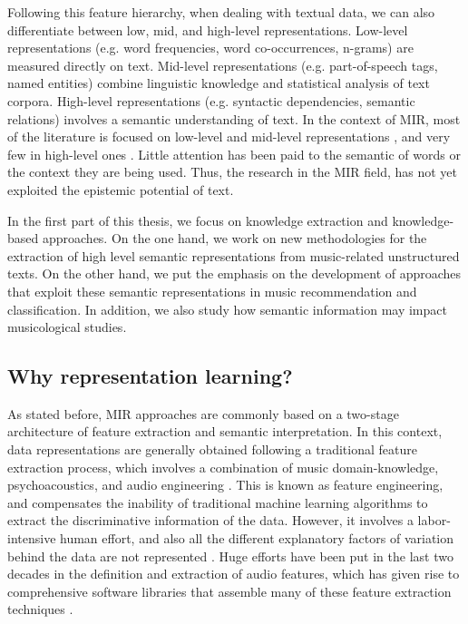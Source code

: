 Following this feature hierarchy, when dealing with textual data, we can also differentiate between low, mid, and high-level representations. Low-level representations (e.g. word frequencies, word co-occurrences, n-grams) are measured directly on text. Mid-level representations (e.g. part-of-speech tags, named entities) combine linguistic knowledge and statistical analysis of text corpora. High-level representations (e.g. syntactic dependencies, semantic relations) involves a semantic understanding of text. In the context of MIR, most of the literature is focused on low-level and mid-level representations \citep{Celma2006,lamere2008social,Whitman2002,Knees2013}, and very few in high-level ones \citep{Tata2010,Knees2011,Sordo2012}. Little attention has been paid to the semantic of words or the context they are being used. Thus, the research in the MIR field, has not yet exploited the epistemic potential of text.

In the first part of this thesis, we focus on knowledge extraction and knowledge-based approaches. On the one hand, we work on new methodologies for the extraction of high level semantic representations from music-related unstructured texts. On the other hand, we put the emphasis on the development of approaches that exploit these semantic representations in music recommendation and classification. In addition, we also study how semantic information may impact musicological studies.

\subsection{Why representation learning?}
\label{sec:intro:learning}

As stated before, MIR approaches are commonly based on a two-stage architecture of feature extraction and semantic interpretation. In this context, data representations are generally obtained following a traditional feature extraction process, which involves a combination of music domain-knowledge, psychoacoustics, and audio engineering \citep{humphrey2012}. 
This is known as feature engineering, and compensates the inability of traditional machine learning algorithms to extract the discriminative information of the data. However, it involves a labor-intensive human effort, and also all the different explanatory factors of variation behind the data are not represented \citep{bengio2013representation}. 
Huge efforts have been put in the last two decades in the definition and extraction of audio features, which has given rise to comprehensive software libraries that assemble many of these feature extraction techniques \citep{bogdanov2013essentia, Mcfee2015}. 

